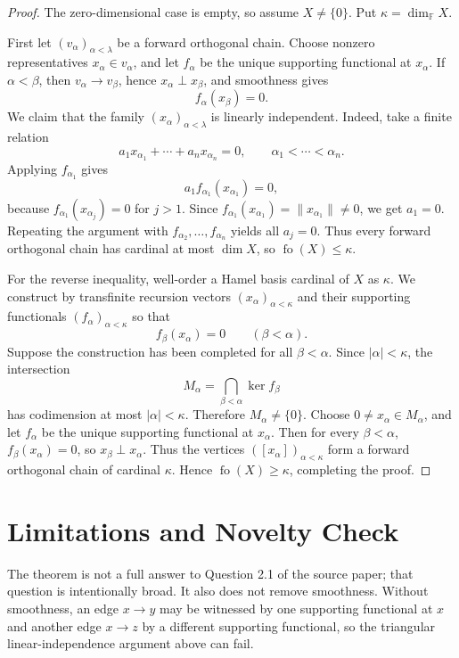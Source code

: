 \documentclass[11pt]{article}
\newcommand{\F}{\mathbb F}
\begin{document}
\begin{proof}
The zero-dimensional case is empty, so assume \(X\neq\{0\}\).  Put
\(\kappa=\dim_{\F}X\).

First let \((v_\alpha)_{\alpha<\lambda}\) be a forward orthogonal chain.  Choose
nonzero representatives \(x_\alpha\in v_\alpha\), and let \(f_\alpha\) be the
unique supporting functional at \(x_\alpha\).  If \(\alpha<\beta\), then
\(v_\alpha\to v_\beta\), hence \(x_\alpha\perp x_\beta\), and smoothness gives
\[
  f_\alpha(x_\beta)=0.
\]
We claim that the family \((x_\alpha)_{\alpha<\lambda}\) is linearly
independent.  Indeed, take a finite relation
\[
  a_1x_{\alpha_1}+\cdots+a_nx_{\alpha_n}=0,
  \qquad \alpha_1<\cdots<\alpha_n .
\]
Applying \(f_{\alpha_1}\) gives
\[
  a_1f_{\alpha_1}(x_{\alpha_1})=0,
\]
because \(f_{\alpha_1}(x_{\alpha_j})=0\) for \(j>1\).  Since
\(f_{\alpha_1}(x_{\alpha_1})=\|x_{\alpha_1}\|\neq 0\), we get \(a_1=0\).
Repeating the argument with \(f_{\alpha_2},\ldots,f_{\alpha_n}\) yields
all \(a_j=0\).  Thus every forward orthogonal chain has cardinal at most
\(\dim X\), so \(\operatorname{fo}(X)\leq\kappa\).

For the reverse inequality, well-order a Hamel basis cardinal of \(X\) as
\(\kappa\).  We construct by transfinite recursion vectors
\((x_\alpha)_{\alpha<\kappa}\) and their supporting functionals
\((f_\alpha)_{\alpha<\kappa}\) so that
\[
  f_\beta(x_\alpha)=0 \qquad(\beta<\alpha).
\]
Suppose the construction has been completed for all \(\beta<\alpha\).  Since
\(|\alpha|<\kappa\), the intersection
\[
  M_\alpha=\bigcap_{\beta<\alpha}\ker f_\beta
\]
has codimension at most \(|\alpha|<\kappa\).  Therefore \(M_\alpha\neq\{0\}\).
Choose \(0\neq x_\alpha\in M_\alpha\), and let \(f_\alpha\) be the unique
supporting functional at \(x_\alpha\).  Then for every \(\beta<\alpha\),
\(f_\beta(x_\alpha)=0\), so \(x_\beta\perp x_\alpha\).  Thus the vertices
\(([x_\alpha])_{\alpha<\kappa}\) form a forward orthogonal chain of cardinal
\(\kappa\).  Hence \(\operatorname{fo}(X)\geq\kappa\), completing the proof.
\end{proof}

\section*{Limitations and Novelty Check}

The theorem is not a full answer to Question 2.1 of the source paper; that
question is intentionally broad.  It also does not remove smoothness.  Without
smoothness, an edge \(x\to y\) may be witnessed by one supporting functional at
\(x\) and another edge \(x\to z\) by a different supporting functional, so the
triangular linear-independence argument above can fail.
\end{document}

